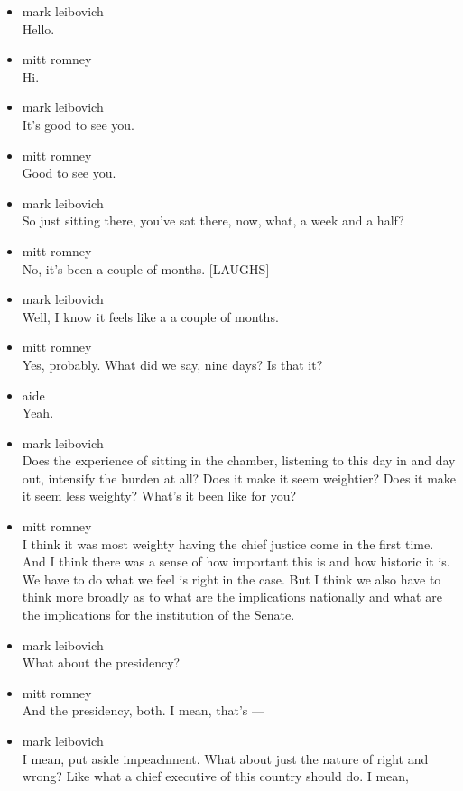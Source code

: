 \begin{itemize}
\item
  mark leibovich\\
  Hello.
\item
  mitt romney\\
  Hi.
\item
  mark leibovich\\
  It's good to see you.
\item
  mitt romney\\
  Good to see you.
\item
  mark leibovich\\
  So just sitting there, you've sat there, now, what, a week and a half?
\item
  mitt romney\\
  No, it's been a couple of months. {[}LAUGHS{]}
\item
  mark leibovich\\
  Well, I know it feels like a a couple of months.
\item
  mitt romney\\
  Yes, probably. What did we say, nine days? Is that it?
\item
  aide\\
  Yeah.
\item
  mark leibovich\\
  Does the experience of sitting in the chamber, listening to this day
  in and day out, intensify the burden at all? Does it make it seem
  weightier? Does it make it seem less weighty? What's it been like for
  you?
\item
  mitt romney\\
  I think it was most weighty having the chief justice come in the first
  time. And I think there was a sense of how important this is and how
  historic it is. We have to do what we feel is right in the case. But I
  think we also have to think more broadly as to what are the
  implications nationally and what are the implications for the
  institution of the Senate.
\item
  mark leibovich\\
  What about the presidency?
\item
  mitt romney\\
  And the presidency, both. I mean, that's ---
\item
  mark leibovich\\
  I mean, put aside impeachment. What about just the nature of right and
  wrong? Like what a chief executive of this country should do. I mean,

\end{itemize}
